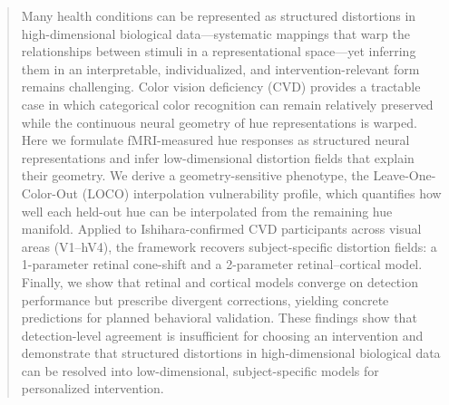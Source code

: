 \documentclass{article}
\begin{document}

\printAffiliationsAndNotice{}

\begin{abstract}
Many health conditions can be represented as structured distortions in high-dimensional biological data—systematic mappings that warp the relationships between stimuli in a representational space—yet inferring them in an interpretable, individualized, and intervention-relevant form remains challenging.
Color vision deficiency (CVD) provides a tractable case in which categorical color recognition can remain relatively preserved while the continuous neural geometry of hue representations is warped.
Here we formulate fMRI-measured hue responses as structured neural representations and infer low-dimensional distortion fields that explain their geometry.
We derive a geometry-sensitive phenotype, the Leave-One-Color-Out (LOCO) interpolation vulnerability profile, which quantifies how well each held-out hue can be interpolated from the remaining hue manifold.
Applied to Ishihara-confirmed CVD participants across visual areas (V1--hV4), the framework recovers subject-specific distortion fields: a 1-parameter retinal cone-shift and a 2-parameter retinal--cortical model.
Finally, we show that retinal and cortical models converge on detection performance but prescribe divergent corrections, yielding concrete predictions for planned behavioral validation.
These findings show that detection-level agreement is insufficient for choosing an intervention and demonstrate that structured distortions in high-dimensional biological data can be resolved into low-dimensional, subject-specific models for personalized intervention.
\end{abstract}
\end{document}
